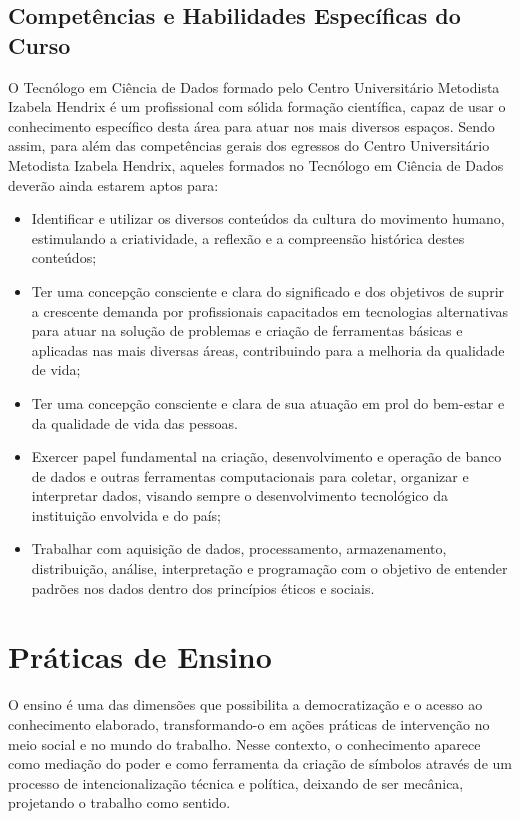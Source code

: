 \documentclass[a4paper, 12pt, openright, oneside, german, french, english, brazil]{abntex2}
\begin{document}
\section{Competências e Habilidades Específicas do Curso}

O Tecnólogo em Ciência de Dados formado pelo Centro Universitário Metodista Izabela Hendrix é um profissional com sólida formação científica, capaz de usar o conhecimento específico desta área para atuar nos mais diversos espaços. Sendo assim, para além das competências gerais dos egressos do Centro Universitário Metodista Izabela Hendrix, aqueles formados no Tecnólogo em Ciência de Dados deverão ainda estarem aptos para:

\begin{itemize}
\item Identificar e utilizar os diversos conteúdos da cultura do movimento humano, estimulando a criatividade, a reflexão e a compreensão histórica destes conteúdos;
\item Ter uma concepção consciente e clara do significado e dos objetivos de suprir a crescente demanda por profissionais capacitados em tecnologias alternativas para atuar na solução de problemas e criação de ferramentas básicas e aplicadas nas mais diversas áreas, contribuindo para a melhoria da qualidade de vida;
\item Ter uma concepção consciente e clara de sua atuação em prol do bem-estar e da qualidade de vida das pessoas.
\item Exercer papel fundamental na criação, desenvolvimento e operação de banco de dados e outras ferramentas computacionais para coletar, organizar e interpretar dados, visando sempre o desenvolvimento tecnológico da instituição envolvida e do país;
\item Trabalhar com aquisição de dados, processamento, armazenamento, distribuição, análise, interpretação e programação com o objetivo de entender padrões nos dados dentro dos princípios éticos e sociais.
\end{itemize}

\chapter{Práticas de Ensino}

O ensino é uma das dimensões que possibilita a democratização e o acesso ao conhecimento elaborado, transformando-o em ações práticas de intervenção no meio social e no mundo do trabalho. Nesse contexto, o conhecimento aparece como mediação do poder e como ferramenta da criação de símbolos através de um processo de intencionalização técnica e política, deixando de ser mecânica, projetando o trabalho como sentido.
\end{document}
